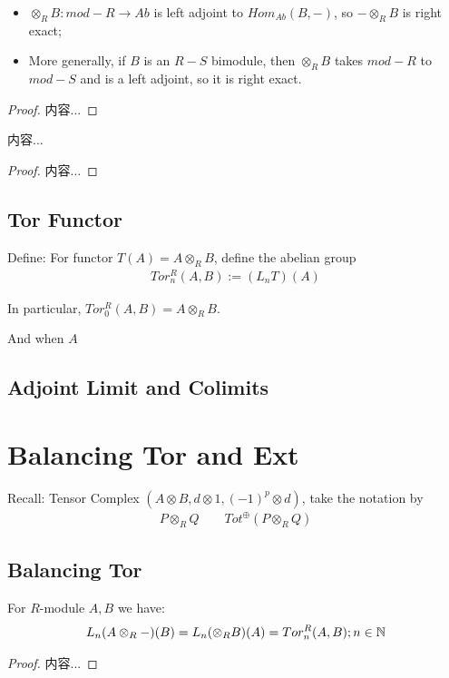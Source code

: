 \documentclass[Total.tex]{subfiles}
\begin{document}
			\begin{corollary}
				\begin{itemize}
				\item $\otimes_R B:mod-R\rightarrow Ab$ is left adjoint to $Hom_{Ab}(B,-)$, so $-\otimes_R B$ is right exact;
				\item More generally, if $B$ is an $R-S$ bimodule, then $\otimes_RB$ takes $mod-R$ to $mod-S$ and is a left adjoint, so it is right exact.
				\end{itemize}
			\end{corollary}
			\begin{proof}
				内容...
			\end{proof}
			
			\begin{proposition}
				内容...
			\end{proposition}
			\begin{proof}
				内容...
			\end{proof}
			\subsection{Tor Functor}
			\begin{Def}
				Define: For functor $T(A)=A\otimes_R B$, define the abelian group
				\begin{gather*}
					Tor^R_n(A,B):=(L_n T)(A)
				\end{gather*}
				
				In particular, $Tor_0^R(A,B)=A\otimes_R B$. 
				
				And when $A$
			\end{Def}
			\subsection{Adjoint Limit and Colimits}
		\section{Balancing Tor and Ext}
			Recall: Tensor Complex $(A\otimes B,d\otimes 1,(-1)^p\otimes d)$, take the notation by
			\begin{gather*}
				P\otimes_R Q\qquad Tot^\oplus(P\otimes_R Q)
			\end{gather*}
			
			\subsection{Balancing Tor}
			\begin{theorem} 
				For $R$-module $A,B$ we have:
				\begin{gather*}
					L_n(A\otimes_R -)(B)=L_n(\otimes_R B)(A)=Tor^R_n(A,B);n\in \mathbb{N}
				\end{gather*}
			\end{theorem}
			\begin{proof}
				内容...
			\end{proof}
			
\end{document}

